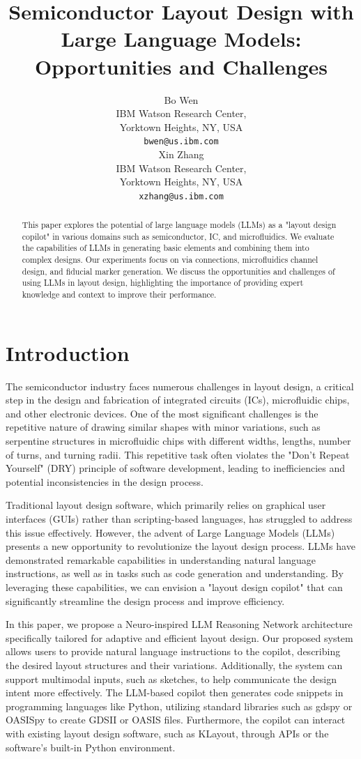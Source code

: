 \documentclass{article}
\title{Semiconductor Layout Design with Large Language Models: Opportunities and Challenges}
\author{%
  Bo Wen\\
  IBM Watson Research Center, \\
  Yorktown Heights, NY, USA \\
  \texttt{bwen@us.ibm.com} \\
  \And
  Xin Zhang\\
  IBM Watson Research Center, \\
  Yorktown Heights, NY, USA \\
  \texttt{xzhang@us.ibm.com} \\
}
\begin{document}
\maketitle

\begin{abstract}
  This paper explores the potential of large language models (LLMs) as a "layout design copilot" in various domains such as semiconductor, IC, and microfluidics. We evaluate the capabilities of LLMs in generating basic elements and combining them into complex designs. Our experiments focus on via connections, microfluidics channel design, and fiducial marker generation. We discuss the opportunities and challenges of using LLMs in layout design, highlighting the importance of providing expert knowledge and context to improve their performance.
\end{abstract}

\section{Introduction}
The semiconductor industry faces numerous challenges in layout design, a critical step in the design and fabrication of integrated circuits (ICs), microfluidic chips, and other electronic devices. One of the most significant challenges is the repetitive nature of drawing similar shapes with minor variations, such as serpentine structures in microfluidic chips with different widths, lengths, number of turns, and turning radii. This repetitive task often violates the "Don't Repeat Yourself" (DRY) principle of software development, leading to inefficiencies and potential inconsistencies in the design process.

Traditional layout design software, which primarily relies on graphical user interfaces (GUIs) rather than scripting-based languages, has struggled to address this issue effectively. However, the advent of Large Language Models (LLMs) presents a new opportunity to revolutionize the layout design process. LLMs have demonstrated remarkable capabilities in understanding natural language instructions, as well as in tasks such as code generation and understanding. By leveraging these capabilities, we can envision a "layout design copilot" that can significantly streamline the design process and improve efficiency.

In this paper, we propose a Neuro-inspired LLM Reasoning Network architecture specifically tailored for adaptive and efficient layout design. Our proposed system allows users to provide natural language instructions to the copilot, describing the desired layout structures and their variations. Additionally, the system can support multimodal inputs, such as sketches, to help communicate the design intent more effectively. The LLM-based copilot then generates code snippets in programming languages like Python, utilizing standard libraries such as gdspy or OASISpy to create GDSII or OASIS files. Furthermore, the copilot can interact with existing layout design software, such as KLayout, through APIs or the software's built-in Python environment.
\end{document}
